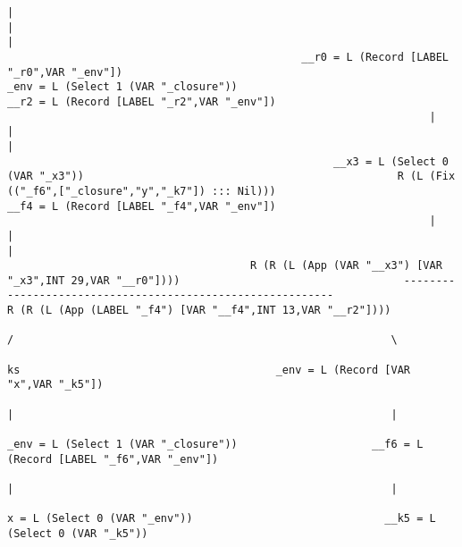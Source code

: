 \begin{landscape}
\begin{lstlisting}[basicstyle=\fontsize{4.5}{5.5}\selectfont\ttfamily]
                                                                  |                                                                                         |                                                                                          |
                                              __r0 = L (Record [LABEL "_r0",VAR "_env"])                                                   _env = L (Select 1 (VAR "_closure"))                                                    __r2 = L (Record [LABEL "_r2",VAR "_env"])
                                                                  |                                                                                         |                                                                                          |
                                                   __x3 = L (Select 0 (VAR "_x3"))                                                 R (L (Fix (("_f6",["_closure","y","_k7"]) ::: Nil)))                                            __f4 = L (Record [LABEL "_f4",VAR "_env"])
                                                                  |                                                                                         |                                                                                          |
                                      R (R (L (App (VAR "__x3") [VAR "_x3",INT 29,VAR "__r0"])))                                   -----------------------------------------------------------                            R (R (L (App (LABEL "_f4") [VAR "__f4",INT 13,VAR "__r2"])))
                                                                                                                                  /                                                           \
                                                                                                                                  ks                                        _env = L (Record [VAR "x",VAR "_k5"])
                                                                                                                                  |                                                           |
                                                                                                                 _env = L (Select 1 (VAR "_closure"))                     __f6 = L (Record [LABEL "_f6",VAR "_env"])
                                                                                                                                  |                                                           |
                                                                                                                    x = L (Select 0 (VAR "_env"))                              __k5 = L (Select 0 (VAR "_k5"))

\end{lstlisting}
\end{landscape}
